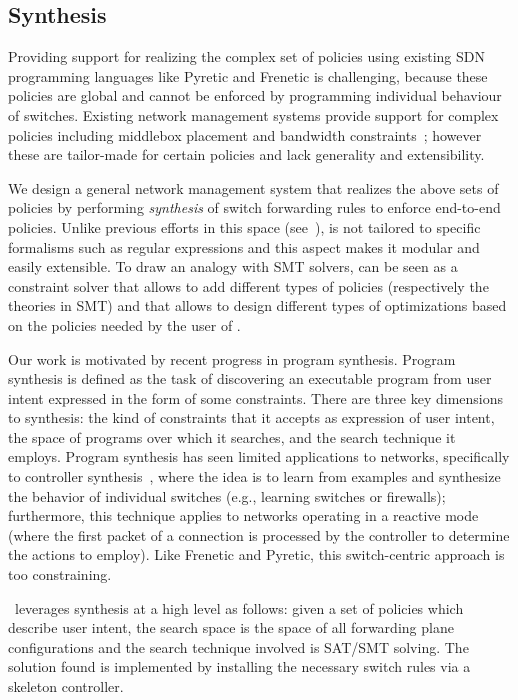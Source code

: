 \subsection{Synthesis} \label{sec:synthesis} 

Providing support for realizing the complex set of policies using
existing SDN programming languages like Pyretic and Frenetic is
challenging, because these policies are global and cannot be enforced
by programming individual behaviour of switches. Existing network
management systems provide support for complex policies including
middlebox placement and bandwidth constraints~\cite{}; however these
are tailor-made for certain policies and lack generality and
extensibility.

We design a general network management system that realizes the above
sets of policies by performing {\em synthesis} of switch forwarding
rules to enforce end-to-end policies. 
Unlike previous efforts in this space (see~\cite{}),
\Name is not tailored to 
specific formalisms such as regular expressions and
this aspect makes it modular  and easily extensible.
To draw an analogy with SMT solvers, 
\Name can be seen as a constraint solver
that allows to add different types of policies (respectively the theories in SMT) and
that allows to design different types of optimizations based on the 
policies needed by the user of \Name.

Our work is motivated by recent
progress in program synthesis. 
Program synthesis is defined as the task of discovering an executable
program from user intent expressed in the form of some
constraints. There are three key dimensions to synthesis: the kind of
constraints that it accepts as expression of user intent, the space of
programs over which it searches, and the search technique it
employs. Program synthesis has seen limited applications to networks,
specifically to controller synthesis~\cite{netegg}, where the idea is
to learn from examples and synthesize the behavior of individual
switches (e.g., learning switches or firewalls); furthermore, this
technique applies to networks operating in a reactive mode (where the
first packet of a connection is processed by the controller to
determine the actions to employ). Like Frenetic and Pyretic, this
switch-centric approach is too constraining.

\Name\ leverages synthesis at a high level as follows: given a set of
policies which describe user intent, the search space is the space of
all forwarding plane configurations and the search technique involved
is SAT/SMT solving. The solution found is implemented by installing
the necessary switch rules via a skeleton controller.

